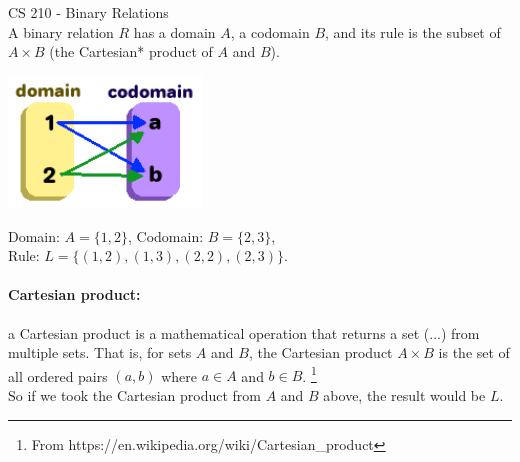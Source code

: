 \documentclass[a4paper,12pt]{book}
\begin{document}
        \newpage
        \begin{intro}{CS 210 - Binary Relations} ~\\
            A binary relation $R$ has
            a domain $A$, a codomain $B$, and its rule is the subset of
            $A \times B$ (the Cartesian* product of $A$ and $B$).

            \begin{center}
                \includegraphics[height=3.5cm]{images/5-3-relation.png}                
            \end{center}

            \begin{center}
                Domain: $A = \{1, 2\}$, Codomain: $B = \{2, 3\}$, ~\\
                Rule: $L = \{(1, 2), (1, 3), (2, 2), (2, 3)\}$.
            \end{center}

            \paragraph{Cartesian product:}
            a Cartesian product is a mathematical operation that returns a set (...) from multiple sets.
            That is, for sets $A$ and $B$, the Cartesian product $A \times B$ is the set of all ordered pairs
            $(a, b)$ where $a \in A$ and $b \in B$.
            \footnote{From https://en.wikipedia.org/wiki/Cartesian\_product}
            \\
            So if we took the Cartesian product from $A$ and $B$ above,
            the result would be $L$.
        \end{intro}
\end{document}
